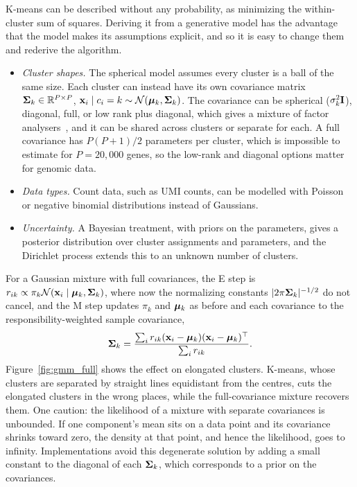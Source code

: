 K-means can be described without any probability, as minimizing the within-cluster sum of squares. Deriving it from a generative model has the advantage that the model makes its assumptions explicit, and so it is easy to change them and rederive the algorithm.
\begin{itemize}
  \item \emph{Cluster shapes.} The spherical model assumes every cluster is a ball of the same size. Each cluster can instead have its own covariance matrix $\boldsymbol{\Sigma}_k\in\mathbb{R}^{P\times P}$, $\mathbf{x}_i\mid c_i=k\sim\mathcal{N}(\boldsymbol{\mu}_k,\boldsymbol{\Sigma}_k)$. The covariance can be spherical ($\sigma_k^2\mathbf{I}$), diagonal, full, or low rank plus diagonal, which gives a mixture of factor analysers~\citep{ghahramani1996}, and it can be shared across clusters or separate for each. A full covariance has $P(P+1)/2$ parameters per cluster, which is impossible to estimate for $P=20{,}000$ genes, so the low-rank and diagonal options matter for genomic data.
  \item \emph{Data types.} Count data, such as UMI counts, can be modelled with Poisson or negative binomial distributions instead of Gaussians.
  \item \emph{Uncertainty.} A Bayesian treatment, with priors on the parameters, gives a posterior distribution over cluster assignments and parameters, and the Dirichlet process extends this to an unknown number of clusters.
\end{itemize}

For a Gaussian mixture with full covariances, the E step is $r_{ik}\propto\pi_k\mathcal{N}(\mathbf{x}_i\mid\boldsymbol{\mu}_k,\boldsymbol{\Sigma}_k)$, where now the normalizing constants $|2\pi\boldsymbol{\Sigma}_k|^{-1/2}$ do not cancel, and the M step updates $\pi_k$ and $\boldsymbol{\mu}_k$ as before and each covariance to the responsibility-weighted sample covariance,
\begin{equation}
  \boldsymbol{\Sigma}_k = \frac{\sum_i r_{ik}(\mathbf{x}_i-\boldsymbol{\mu}_k)(\mathbf{x}_i-\boldsymbol{\mu}_k)^\top}{\sum_i r_{ik}}.
\end{equation}
Figure~\ref{fig:gmm_full} shows the effect on elongated clusters. K-means, whose clusters are separated by straight lines equidistant from the centres, cuts the elongated clusters in the wrong places, while the full-covariance mixture recovers them. One caution: the likelihood of a mixture with separate covariances is unbounded. If one component's mean sits on a data point and its covariance shrinks toward zero, the density at that point, and hence the likelihood, goes to infinity. Implementations avoid this degenerate solution by adding a small constant to the diagonal of each $\boldsymbol{\Sigma}_k$, which corresponds to a prior on the covariances.

